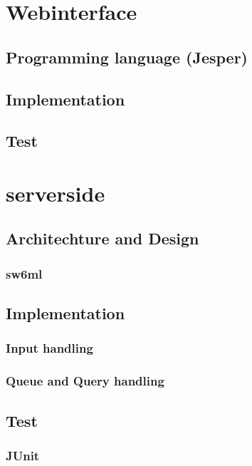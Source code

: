   \section{Webinterface}
   \label{sect:webInterface}
     \subsection{Programming language (Jesper)}
      
     \subsection{Implementation}
     \subsection{Test}
		

  \section{serverside} %
    
    \subsection{Architechture and Design}
      
      \subsubsection{sw6ml} %
         \label{sw6ml}
	  
	  
    \subsection{Implementation}
      \subsubsection{Input handling} %
		
      \subsubsection{Queue and Query handling} %
	  \label{QQHandling}
	    
    \subsection{Test}
      \subsubsection{JUnit}

